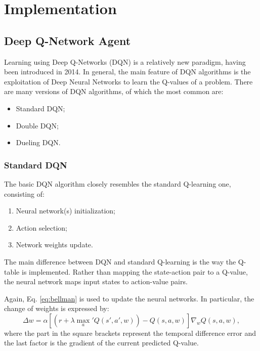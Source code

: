 \documentclass[a4paper, 12pt]{article}
\numberwithin{equation}{section}
\begin{document}
\section{Implementation}



\subsection[Deep Q-Network Agent]{Deep Q-Network Agent \cite{dqn-tutorial, improvements}}

Learning using Deep Q-Networks (DQN) is a relatively new paradigm, having been introduced in 2014. In general, the main feature of DQN algorithms is the exploitation of Deep Neural Networks to learn the Q-values of a problem. There are many versions of DQN algorithms, of which the most common are:
\begin{itemize}
	\item Standard DQN;
	\item Double DQN;
	\item Dueling DQN.
\end{itemize}


\subsubsection{Standard DQN}

The basic DQN algorithm closely resembles the standard Q-learning one, consisting of:
\begin{enumerate}
	\item Neural network(s) initialization;
	\item Action selection;
	\item Network weights update.
\end{enumerate}

The main difference between DQN and standard Q-learning is the way the Q-table is implemented. Rather than mapping the state-action pair to a Q-value, the neural network maps input states to action-value pairs.

Again, Eq. \eqref{eq:bellman} is used to update the neural networks. In particular, the change of weights is expressed by:
\begin{equation}\label{eq:weights}
	\Delta w = \alpha\left[\left(r+\lambda\max_a' Q\left(s',a',w\right)\right)-Q\left(s,a,w\right)\right]\nabla_wQ\left(s,a,w\right),
\end{equation}
where the part in the square brackets represent the temporal difference error and the last factor is the gradient of the current predicted Q-value.
\end{document}
